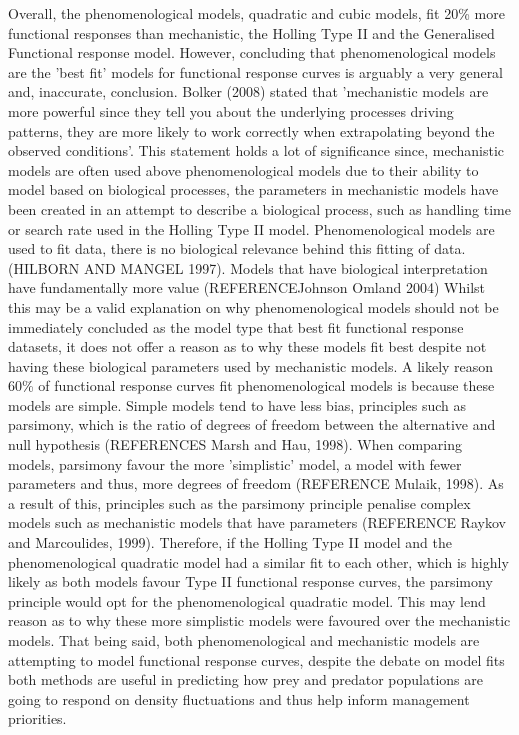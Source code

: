\documentclass[11pt]{article}
\begin{document}
Overall, the phenomenological models, quadratic and cubic models, fit 20\% more functional responses than mechanistic, the Holling Type II and the Generalised Functional response model. However, concluding that phenomenological models are the 'best fit' models for functional response curves is arguably a very general and, inaccurate, conclusion. Bolker (2008) stated that 'mechanistic models are more powerful since they tell you about the underlying processes driving patterns, they are more likely to work correctly when extrapolating beyond the observed conditions'. This statement holds a lot of significance since, mechanistic models are often used above phenomenological models due to their ability to model based on biological processes, the parameters in mechanistic models have been created in an attempt to describe a biological process, such as handling time or search rate used in the Holling Type II model. Phenomenological models are used to fit data, there is no biological relevance behind this fitting of data.  (HILBORN AND MANGEL 1997). Models that have biological interpretation have fundamentally more value (REFERENCEJohnson Omland 2004) \newline
Whilst this may be a valid explanation on why phenomenological models should not be immediately concluded as the model type that best fit functional response datasets, it does not offer a reason as to why these models fit best despite not having these biological parameters used by mechanistic models. A likely reason 60\% of functional response curves fit phenomenological models is because these models are simple. Simple models tend to have less bias, principles such as parsimony, which is the ratio of degrees of freedom between the alternative and null hypothesis (REFERENCES Marsh and Hau, 1998). When comparing models, parsimony favour the more 'simplistic' model, a model with fewer parameters and thus, more degrees of freedom (REFERENCE Mulaik, 1998). As a result of this, principles such as the parsimony principle penalise complex models such as mechanistic models that have parameters (REFERENCE Raykov and Marcoulides, 1999). Therefore, if the Holling Type II model and the phenomenological quadratic model had a similar fit to each other, which is highly likely as both models favour Type II functional response curves, the parsimony principle would opt for the phenomenological quadratic model. This may lend reason as to why these more simplistic models were favoured over the mechanistic models. That being said, both phenomenological and mechanistic models are attempting to model functional response curves, despite the debate on model fits both methods are useful in predicting how prey and predator populations are going to respond on density fluctuations and thus help inform management priorities. 
\end{document}
